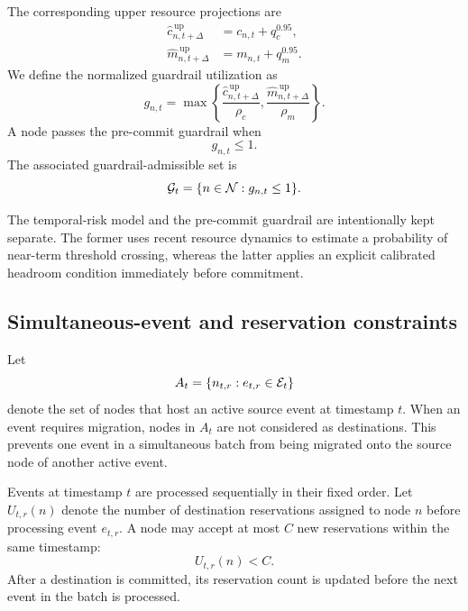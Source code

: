 The corresponding upper resource projections are
\begin{align}
\label{eq:cpu-upper}
    \widehat{c}^{\,\mathrm{up}}_{n,t+\Delta}
    &=
    c_{n,t}+q_c^{0.95},\\
\label{eq:memory-upper}
    \widehat{m}^{\,\mathrm{up}}_{n,t+\Delta}
    &=
    m_{n,t}+q_m^{0.95}.
\end{align}
We define the normalized guardrail utilization as
\begin{equation}
\label{eq:guardrail}
    g_{n,t}
    =
    \max
    \left\{
        \frac{
            \widehat{c}^{\,\mathrm{up}}_{n,t+\Delta}
        }{\rho_c},
        \frac{
            \widehat{m}^{\,\mathrm{up}}_{n,t+\Delta}
        }{\rho_m}
    \right\}.
\end{equation}
A node passes the pre-commit guardrail when
\begin{equation}
\label{eq:q95-executable}
    g_{n,t}\leq 1.
\end{equation}
The associated guardrail-admissible set is
\begin{equation}
\label{eq:guardrail-set}
    \mathcal{G}_t
    =
    \{n\in\mathcal{N}:g_{n,t}\leq1\}.
\end{equation}

The temporal-risk model and the pre-commit guardrail are intentionally
kept separate. The former uses recent resource dynamics to estimate a
probability of near-term threshold crossing, whereas the latter applies
an explicit calibrated headroom condition immediately before commitment.

\subsection{Simultaneous-event and reservation constraints}

Let
\begin{equation}
\label{eq:active-source-set}
    A_t
    =
    \{n_{t,r}:e_{t,r}\in\mathcal{E}_t\}
\end{equation}
denote the set of nodes that host an active source event at timestamp
$t$. When an event requires migration, nodes in $A_t$ are not considered
as destinations. This prevents one event in a simultaneous batch from
being migrated onto the source node of another active event.

Events at timestamp $t$ are processed sequentially in their fixed order.
Let $U_{t,r}(n)$ denote the number of destination reservations assigned
to node $n$ before processing event $e_{t,r}$. A node may accept at most
$C$ new reservations within the same timestamp:
\begin{equation}
\label{eq:reservation-capacity}
    U_{t,r}(n)<C.
\end{equation}
After a destination is committed, its reservation count is updated
before the next event in the batch is processed.

